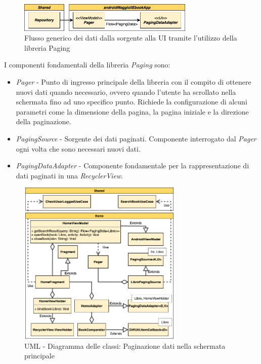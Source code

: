 \begin{figure}[H]
\centering
\includegraphics[width=0.75\textwidth]{img/tesi-2-Page-11.drawio.png}
\caption{Flusso generico dei dati dalla sorgente alla UI tramite l'utilizzo della libreria Paging}
\label{paging}
\end{figure}

I componenti fondamentali della libreria \textit{Paging} sono:
\begin{itemize}
    \item \textit{Pager} - Punto di ingresso principale della libreria con il compito di ottenere nuovi dati quando necessario, ovvero quando l'utente ha scrollato nella schermata fino ad uno specifico punto. Richiede la configurazione di alcuni parametri come la dimensione della pagina, la pagina iniziale e la direzione della paginazione. 
    \item \textit{PagingSource} - Sorgente dei dati paginati. Componente interrogato dal \textit{Pager} ogni volta che sono necessari nuovi dati.
    \item \textit{PagingDataAdapter} - Componente fondamentale per la rappresentazione di dati paginati in una \textit{RecyclerView}.
\end{itemize}

\begin{figure}[H]
\centering
\includegraphics[width=0.7\textwidth]{img/tesi-24-androidviewuml.drawio.png}
\caption{UML - Diagramma delle classi: Paginazione dati nella schermata principale}
\label{paging2}
\end{figure}

